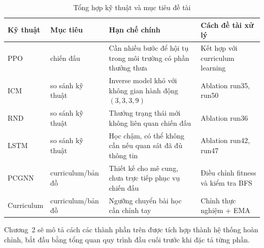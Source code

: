 \begin{table}[H]
    \centering
    \small
    \caption{Tổng hợp kỹ thuật và mục tiêu đề tài}
    \label{tab:technique_summary}
    \begin{tabular}{|p{2.0cm}|p{2.2cm}|p{4.5cm}|p{4.0cm}|}
        \hline
        \textbf{Kỹ thuật} & \textbf{Mục tiêu} & \textbf{Hạn chế chính} & \textbf{Cách đề tài xử lý} \\
        \hline
        PPO & chiến đấu & Cần nhiều bước để hội tụ trong môi trường có phần thưởng thưa & Kết hợp với curriculum learning \\
        \hline
        ICM & so sánh kỹ thuật & Inverse model khó với không gian hành động $(3,3,3,9)$ & Ablation run35, run50 \\
        \hline
        RND & so sánh kỹ thuật & Thưởng trạng thái mới không liên quan chiến đấu & Ablation run36 \\
        \hline
        LSTM & so sánh kỹ thuật & Học chậm, có thể không cần nếu quan sát đã đủ thông tin & Ablation run42, run47 \\
        \hline
        PCGNN & curriculum/bản đồ & Thiết kế cho mê cung, chưa trực tiếp phục vụ chiến đấu & Điều chỉnh fitness và kiểm tra BFS \\
        \hline
        Curriculum & curriculum/bản đồ & Ngưỡng chuyển bài học cần chỉnh tay & Chỉnh thực nghiệm + EMA \\
        \hline
    \end{tabular}
\end{table}

Chương~2 sẽ mô tả cách các thành phần trên được tích hợp thành hệ thống hoàn chỉnh, bắt đầu bằng tổng quan quy trình đầu cuối trước khi đặc tả từng phần.
